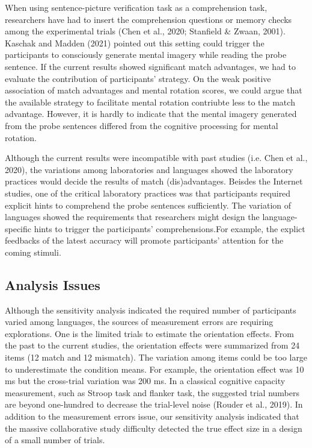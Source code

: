 \documentclass[
  man]{apa7}
\begin{document}
When using sentence-picture verification task as a comprehension task, researchers have had to insert the comprehension questions or memory checks among the experimental trials (Chen et al., 2020; Stanfield \& Zwaan, 2001). Kaschak and Madden (2021) pointed out this setting could trigger the participants to consciously generate mental imagery while reading the probe sentence. If the current results showed significant match advantages, we had to evaluate the contribution of participants' strategy. On the weak positive association of match advantages and mental rotation scores, we could argue that the available strategy to facilitate mental rotation contriubte less to the match advantage. However, it is hardly to indicate that the mental imagery generated from the probe sentences differed from the cognitive processing for mental rotation.

Although the current results were incompatible with past studies (i.e. Chen et al., 2020), the variations among laboratories and languages showed the laboratory practices would decide the results of match (dis)advantages. Beisdes the Internet studies, one of the critical laboratory practices was that participants required explicit hints to comprehend the probe sentences sufficiently. The variation of languages showed the requirements that researchers might design the language-specific hints to trigger the participants' comprehensions.For example, the explict feedbacks of the latest accuracy will promote participants' attention for the coming stimuli.

\hypertarget{analysis-issues}{%
\subsection{Analysis Issues}\label{analysis-issues}}

Although the sensitivity analysis indicated the required number of participants varied among languages, the sources of measurement errors are requiring explorations. One is the limited trials to estimate the orientation effects. From the past to the current studies, the orientation effects were summarized from 24 items (12 match and 12 mismatch). The variation among items could be too large to underestimate the condition means. For example, the orientation effect was 10 ms but the cross-trial variation was 200 ms. In a classical cognitive capacity measurement, such as Stroop task and flanker task, the suggested trial numbers are beyond one-hundred to decrease the trial-level noise (Rouder et al., 2019). In addition to the measurement errors issue, our sensitivity analysis indicated that the massive collaborative study difficulty detected the true effect size in a design of a small number of trials.
\end{document}
